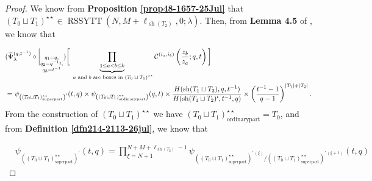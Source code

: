 \documentclass[12pt,reqno,a4paper]{amsart}
\newcommand{\comp}{\circ}
\newcommand{\cals}[1]{\mathcal{#1}}
\numberwithin{equation}{section}
\theoremstyle{definition}
\begin{document}
\begin{proof}
We know from \textbf{Proposition \ref{prop48-1657-25Jul}} that $(T_0 \sqcup T_1)^{\star\star} \in \operatorname{RSSYTT}(N,M + \ell_{\operatorname{sh}(T_2)},0;\lambda)$. Then, from \textbf{Lemma 4.5} of \cite{CSW2025}, we know that 

\footnotesize
\begin{align}
	&(
	\widetilde{\Psi}_{\lambda}^{(q,t^{-1})}
	\comp 
	\bigg|_{
		\substack{
			q_1 = q, \\
			q_2 = q^{-1}t,\\
			q_3 = t^{-1} \\
		}
	}
	)
	\bigg[
	\underbrace{	\prod_{1 \leq a < b \leq k}				}_{\text{ $a$ and $b$ are boxes in $(T_0 \sqcup T_1)^{\star\star}$}}
	\cals{C}^{(i_a,i_b)}\left(
	\frac{z_b}{z_a}
	; q, t
	\right)
	\bigg]
	\\
	&= 
	\psi_{
		\left(	(T_0 \sqcup T_1)^{\star\star}_{\operatorname{super part}}			\right)^\prime
	}(t,q)
	\times
	\psi_{
		\left(	(T_0 \sqcup T_1)^{\star\star}_{\operatorname{ordinary part}}			\right)
	}(q,t)
	\times 
	\frac{
		H(\operatorname{sh}(T_1 \sqcup T_2),q,t^{-1})
	}{
		H(\operatorname{sh}(T_1 \sqcup T_2)^\prime,t^{-1},q)
	}
	\times 
	\left(
	\frac{t^{-1} - 1}{q - 1}
	\right)^{
		|T_1| + |T_2|
	}.
	\notag 
\end{align}
\normalsize
From the construction of $(T_0 \sqcup T_1)^{\star\star}$ we have $(T_0 \sqcup T_1)^{\star\star}_{\operatorname{ordinary part}} = T_0$, and from \textbf{Definition \ref{dfn214-2113-26jul}}, we know that 

\footnotesize
\begin{align}
	&\psi_{
		\left(	(T_0 \sqcup T_1)^{\star\star}_{\operatorname{super part}}			\right)^\prime
	}(t,q)
	= 
	\prod_{\xi = N + 1}^{N + M + \ell_{\operatorname{sh}(T_2)} - 1}
	\psi_{\left(	(T_0 \sqcup T_1)^{\star\star}_{\operatorname{super part}}			\right)^{\prime \, (\xi)}/\left(	(T_0 \sqcup T_1)^{\star\star}_{\operatorname{super part}}			\right)^{\prime \, (\xi + 1)}}(t,q)
\end{align}
\normalsize


\end{proof}
\end{document}
